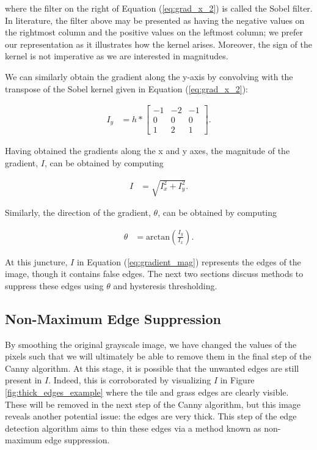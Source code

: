 where the filter on the right of Equation (\ref{eq:grad_x_2}) is called the Sobel 
filter. In literature, the filter above may be presented as having the
negative values on the rightmost column and the positive values on the
leftmost column; we prefer our representation as it illustrates how the
kernel arises. Moreover, the sign of the kernel is not imperative as
we are interested in magnitudes. 

We can similarly obtain the gradient along the y-axis by convolving with
the transpose of the Sobel kernel given in Equation (\ref{eq:grad_x_2}):

\begin{align}\label{eq:grad_y_1}
I_y &= h * 
\begin{bmatrix}
-1 & -2 & -1 \\
0 & 0 & 0 \\
1 & 2 & 1
\end{bmatrix}.
\end{align}

Having obtained the gradients along the x and y axes, the magnitude of
the gradient, $I$, can be obtained by computing

\begin{align}\label{eq:gradient_mag}
I &= \sqrt{I_x^2 + I_y^2}.
\end{align}

Similarly, the direction of the gradient, $\theta$, can be obtained by
computing

\begin{align}\label{eq:gradient_direc}
\theta &= \textrm{arctan}\left(\frac{I_y}{I_x}\right).
\end{align}

At this juncture, $I$ in Equation (\ref{eq:gradient_mag}) represents the edges of
the image, though it contains false edges. The next two sections discuss
methods to suppress these edges using $\theta$ and hysteresis 
thresholding.

\subsection{Non-Maximum Edge Suppression}
By smoothing the original grayscale image, we have changed the values
of the pixels such that we will ultimately be able to remove them in
the final step of the Canny algorithm. At this stage, it is possible
that the unwanted edges are still present in $I$. Indeed, this is 
corroborated by visualizing $I$ in Figure \ref{fig:thick_edges_example}
where the tile and grass edges are clearly visible. These will be
removed in the next step of the Canny algorithm, but this image
reveals another potential issue: the edges are very thick. This
step of the edge detection algorithm aims to thin these edges via
a method known as non-maximum edge suppression.

